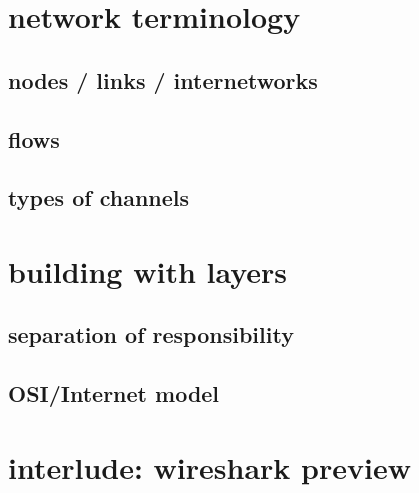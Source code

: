 \date{}
\title{}
\date{}

\begin{frame}
    \titlepage
\end{frame}

\section{network terminology}

\subsection{nodes / links / internetworks}



\subsection{flows}



\subsection{types of channels}




\section{building with layers}

\subsection{separation of responsibility}



\subsection{OSI/Internet model}



\section{interlude: wireshark preview}




